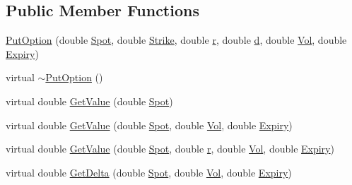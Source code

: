 \subsection*{Public Member Functions}
\begin{DoxyCompactItemize}
\item 
\hyperlink{classMyOption_1_1PutOption_ab8da30b5590d3871c443718c0d32ef4e}{Put\+Option} (double \hyperlink{classMyOption_1_1Option_a6c6f01d75cde7e92d16a6d8d6f331a1d}{Spot}, double \hyperlink{classMyOption_1_1Option_a3033c483588ce26b175280c7f9dee8d1}{Strike}, double \hyperlink{classMyOption_1_1Option_aa8cb250427dece65ea49255d4102cc8d}{r}, double \hyperlink{classMyOption_1_1Option_a500979f4b32262594d895c4a83b58d1d}{d}, double \hyperlink{classMyOption_1_1Option_a5d6002c14b335c782873bf1437113513}{Vol}, double \hyperlink{classMyOption_1_1Option_ac1adacb417fede41d151b9cda05bcb3d}{Expiry})
\item 
virtual \hyperlink{classMyOption_1_1PutOption_adeb4763024d3c2de9d77fb524f782667}{$\sim$\+Put\+Option} ()
\item 
virtual double \hyperlink{classMyOption_1_1PutOption_aebfa13ebcf310890ecb512e110667832}{Get\+Value} (double \hyperlink{classMyOption_1_1Option_a6c6f01d75cde7e92d16a6d8d6f331a1d}{Spot})
\item 
virtual double \hyperlink{classMyOption_1_1PutOption_ad6bc5150fe62246232f8643f72886dd9}{Get\+Value} (double \hyperlink{classMyOption_1_1Option_a6c6f01d75cde7e92d16a6d8d6f331a1d}{Spot}, double \hyperlink{classMyOption_1_1Option_a5d6002c14b335c782873bf1437113513}{Vol}, double \hyperlink{classMyOption_1_1Option_ac1adacb417fede41d151b9cda05bcb3d}{Expiry})
\item 
virtual double \hyperlink{classMyOption_1_1PutOption_a997691a3e08cf0dbf148e24b8fe80dd0}{Get\+Value} (double \hyperlink{classMyOption_1_1Option_a6c6f01d75cde7e92d16a6d8d6f331a1d}{Spot}, double \hyperlink{classMyOption_1_1Option_aa8cb250427dece65ea49255d4102cc8d}{r}, double \hyperlink{classMyOption_1_1Option_a5d6002c14b335c782873bf1437113513}{Vol}, double \hyperlink{classMyOption_1_1Option_ac1adacb417fede41d151b9cda05bcb3d}{Expiry})
\item 
virtual double \hyperlink{classMyOption_1_1PutOption_a7a248fe90a32f48e52e81dff2d11a40d}{Get\+Delta} (double \hyperlink{classMyOption_1_1Option_a6c6f01d75cde7e92d16a6d8d6f331a1d}{Spot}, double \hyperlink{classMyOption_1_1Option_a5d6002c14b335c782873bf1437113513}{Vol}, double \hyperlink{classMyOption_1_1Option_ac1adacb417fede41d151b9cda05bcb3d}{Expiry})
\item 

\end{DoxyCompactItemize}
